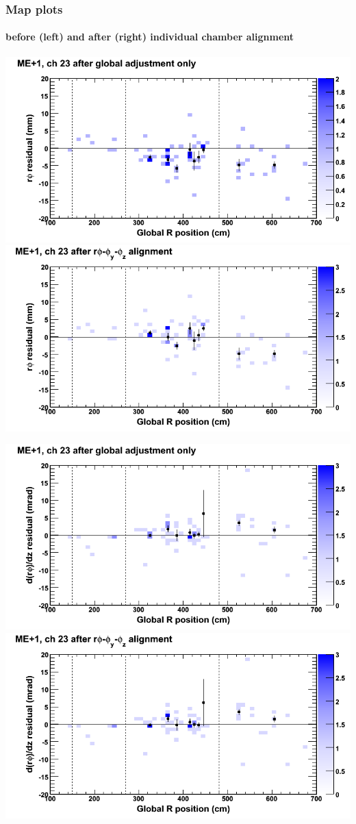 \documentclass[compress]{beamer}
\begin{document}
\begin{frame}
\frametitle{Map plots}
\framesubtitle{before (left) and after (right) individual chamber alignment}
\includegraphics[width=0.5\linewidth]{ringmapplots_3dof/before_CSCvsr_mep1ch23_x.png} \includegraphics[width=0.5\linewidth]{ringmapplots_3dof/after_CSCvsr_mep1ch23_x.png}

\includegraphics[width=0.5\linewidth]{ringmapplots_3dof/before_CSCvsr_mep1ch23_dxdz.png} \includegraphics[width=0.5\linewidth]{ringmapplots_3dof/after_CSCvsr_mep1ch23_dxdz.png}
\end{frame}
\end{document}

